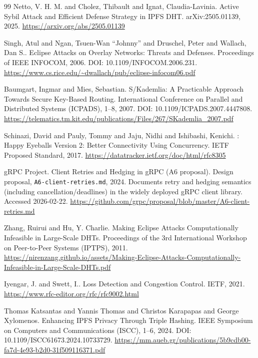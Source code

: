\documentclass[11pt]{article}
\begin{document}
\begin{thebibliography}{99}
Netto, V. H. M. and Cholez, Thibault and Ignat, Claudia{-}Lavinia.
\newblock Active Sybil Attack and Efficient Defense Strategy in {IPFS} {DHT}.
\newblock arXiv:2505.01139, 2025.
\newblock \url{https://arxiv.org/abs/2505.01139}

Singh, Atul and Ngan, Tsuen-Wan ``Johnny'' and Druschel, Peter and Wallach, Dan S..
\newblock Eclipse Attacks on Overlay Networks: Threats and Defenses.
\newblock Proceedings of IEEE INFOCOM, 2006.
\newblock DOI: 10.1109/INFOCOM.2006.231.
\newblock \url{https://www.cs.rice.edu/~dwallach/pub/eclipse-infocom06.pdf}

Baumgart, Ingmar and Mies, Sebastian.
\newblock S/Kademlia: A Practicable Approach Towards Secure Key-Based Routing.
\newblock International Conference on Parallel and Distributed Systems (ICPADS), 1--8, 2007.
\newblock DOI: 10.1109/ICPADS.2007.4447808.
\newblock \url{https://telematics.tm.kit.edu/publications/Files/267/SKademlia_2007.pdf}

Schinazi, David and Pauly, Tommy and Jaju, Nidhi and Ishibashi, Kenichi.
: Happy Eyeballs Version 2: Better Connectivity Using Concurrency.
\newblock IETF Proposed Standard, 2017.
\newblock \url{https://datatracker.ietf.org/doc/html/rfc8305}

{gRPC Project}.
\newblock Client Retries and Hedging in gRPC (A6 proposal).
\newblock Design proposal, \texttt{A6-client-retries.md}, 2024.
\newblock Documents retry and hedging semantics (including cancellation/deadlines) in the widely deployed gRPC client library. Accessed 2026-02-22.
\newblock \url{https://github.com/grpc/proposal/blob/master/A6-client-retries.md}

Zhang, Ruirui and Hu, Y. Charlie.
\newblock Making Eclipse Attacks Computationally Infeasible in Large-Scale DHTs.
\newblock Proceedings of the 3rd International Workshop on Peer-to-Peer Systems (IPTPS), 2011.
\newblock \url{https://nirenzang.github.io/assets/Making-Eclipse-Attacks-Computationally-Infeasible-in-Large-Scale-DHTs.pdf}

Iyengar, J. and Swett, I..
 Loss Detection and Congestion Control.
\newblock IETF, 2021.
\newblock \url{https://www.rfc-editor.org/rfc/rfc9002.html}

Thomas Katsantas and Yannis Thomas and Christos Karapapas and George Xylomenos.
\newblock Enhancing {IPFS} Privacy Through Triple Hashing.
 {IEEE} Symposium on Computers and Communications (ISCC), 1--6, 2024.
\newblock DOI: 10.1109/ISCC61673.2024.10733729.
\newblock \url{https://mm.aueb.gr/publications/5b9cdb00-fa7d-4e93-b2d0-31f509116371.pdf}


\end{thebibliography}
\end{document}
